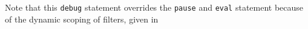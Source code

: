 Note that this \verb|debug| statement overrides the \verb|pause| and \verb|eval| statement because of the dynamic scoping of filters, given in 












